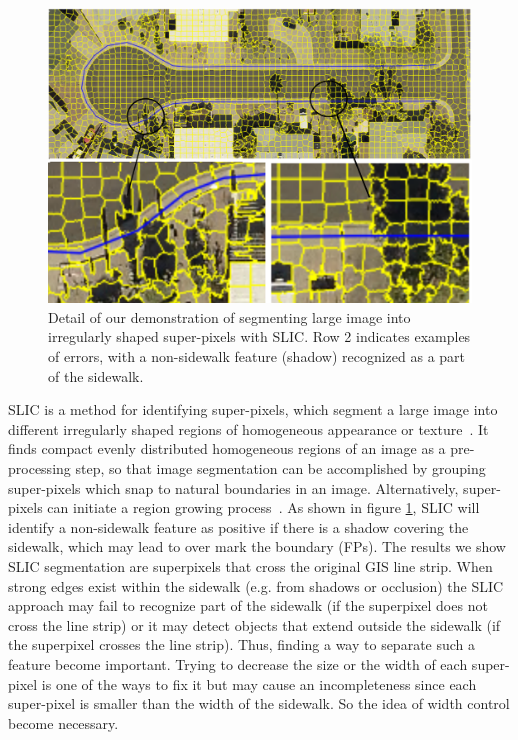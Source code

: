 \begin{figure}[H]
\centering
\includegraphics[width=\textwidth]{Figures/slic_sample1.pdf}
\caption[Example of Simple Linear Iterative Clustering]{
Detail of our demonstration of segmenting large image into irregularly shaped super-pixels with \ac{SLIC}.
Row 2 indicates examples of errors, with a non-sidewalk feature (shadow) recognized as a part of the sidewalk.}
\label{fig:slic}
\end{figure}

\acf{SLIC} is a method for identifying super-pixels, which segment a large image into different
irregularly shaped regions of homogeneous appearance or texture~\cite{Achanta:149300}. It finds
compact evenly distributed homogeneous regions of an image as a pre-processing step, so that image
segmentation can be accomplished by grouping super-pixels which snap to natural boundaries in an
image. Alternatively, super-pixels can initiate a region growing process~\cite{Borovec2017-fz}. As
shown in figure \ref{fig:slic}, \ac{SLIC} will identify a non-sidewalk feature as positive if there
is a shadow covering the sidewalk, which may lead to over mark the boundary (\acp{FP}). 
The results we show \ac{SLIC} segmentation are superpixels that cross the original \ac{GIS} line strip.
When strong edges exist within the sidewalk (e.g. from shadows or occlusion) the \ac{SLIC} approach may
 fail to recognize part of the sidewalk (if the superpixel does not cross the line strip) or it may 
 detect objects that extend outside the sidewalk (if the superpixel crosses the line strip). 
Thus, finding a way to separate such a feature become
important. Trying to decrease the size or the width of each super-pixel is one of the ways to fix
it but may cause an incompleteness since each super-pixel is smaller than the width of the sidewalk.
So the idea of width control become necessary.

